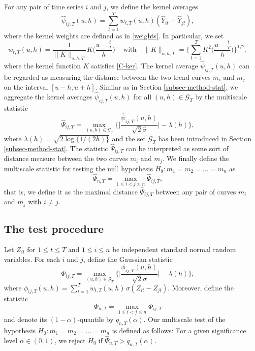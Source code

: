 \documentclass[a4paper,12pt]{article}
\numberwithin{equation}{section}
\begin{document}
For any pair of time series $i$ and $j$, we define the kernel averages
\[ \widehat{\psi}_{ij,T}(u,h) = \sum\limits_{t=1}^T w_{t,T}(u,h)(\widehat{Y}_{it} - \widehat{Y}_{jt}), \]
where the kernel weights are defined as in \eqref{weights}. In particular, we set  
\[ w_{t,T}(u,h) = \frac{1}{\|K\|_{u,h,T}} K\Big( \frac{u - \frac{t}{T}}{h} \Big) \, \quad \text{with} \quad \|K\|_{u,h,T} = \Big\{\sum\limits_{t=1}^T  K^2\Big( \frac{u - \frac{t}{T}}{h} \Big)\Big\}^{1/2}, \]
where the kernel function $K$ satisfies \ref{C-ker}. The kernel average $\widehat{\psi}_{ij,T}(u,h)$ can be regarded as measuring the distance between the two trend curves $m_i$ and $m_j$ on the interval $[u-h,u+h]$. Similar as in Section \ref{subsec-method-stat}, we aggregate the kernel averages $\widehat{\psi}_{ij,T}(u,h)$ for all $(u,h) \in \mathcal{G}_T$ by the multiscale statistic 
\[ \widehat{\Psi}_{ij,T} = \max_{(u,h) \in \mathcal{G}_T} \Big\{ \Big|\frac{\widehat{\psi}_{ij,T}(u,h)}{\sqrt{2} \widehat{\sigma}}\Big| - \lambda(h) \Big\}, \] 
where $\lambda(h) = \sqrt{2 \log \{ 1/(2h) \}}$ and the set $\mathcal{G}_T$ has been introduced in Section \ref{subsec-method-stat}. The statistic $\widehat{\Psi}_{ij,T}$ can be interpreted as some sort of distance measure between the two curves $m_i$ and $m_j$. We finally define the multiscale statistic for testing the null hypothesis $H_0: m_1 =m_2 = \ldots = m_n$ as
\[ \widehat{\Psi}_{n,T} = \max_{1 \le i < j \le n} \widehat{\Psi}_{ij,T}, \]
that is, we define it as the maximal distance $\widehat{\Psi}_{ij,T}$ between any pair of curves $m_i$ and $m_j$ with $i \ne j$. 


\subsection{The test procedure}\label{subsec-test-equality-test}


Let $Z_{it}$ for $1 \le t \le T$ and $1 \le i \le n$ be independent standard normal random variables. For each $i$ and $j$, define the Gaussian statistic 
\[ \Phi_{ij,T} = \max_{(u,h) \in \mathcal{G}_T} \Big\{ \Big|\frac{\phi_{ij,T}(u,h)}{\sqrt{2} \sigma}\Big| - \lambda(h) \Big\}, \] 
where $\phi_{ij,T}(u,h) = \sum\nolimits_{t=1}^T w_{t,T}(u,h) \, \sigma (Z_{it} - Z_{jt})$. Moreover, define the statistic
\[ \Phi_{n,T} = \max_{1 \le i < j \le n} \Phi_{ij,T} \]
and denote its $(1-\alpha)$-quantile by $q_{n,T}(\alpha)$. Our multiscale test of the hypothesis $H_0: m_1 = m_2 = \ldots = m_n$ is defined as follows: For a given significance level $\alpha \in (0,1)$, we reject $H_0$ if $\widehat{\Psi}_{n,T} > q_{n,T}(\alpha)$. 
\end{document}
